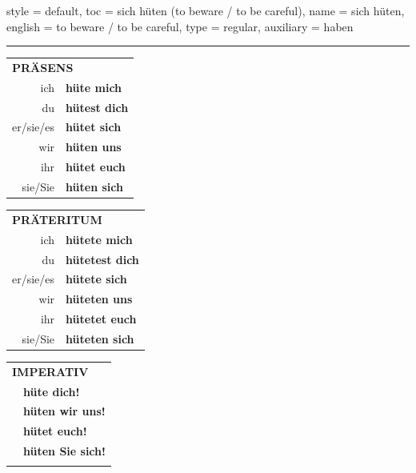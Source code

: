 \begin{verbentry}{
  style = {default},
  toc = {sich hüten (to beware / to be careful)},
  name = {sich hüten},
  english = {to beware / to be careful},
  type = {regular},
  auxiliary = {haben}
}
 
    
     \vspace{5pt}

    \hrule
    
    \vspace{5pt}

  \begin{tabular}{rl}
     \multicolumn{2}{l}{\textbf{PRÄSENS} }\\
    ich & \textbf{hüte mich}\\
    du & \textbf{hütest dich}\\
    er/sie/es & \textbf{hütet sich}\\
    wir & \textbf{hüten uns}\\
    ihr & \textbf{hütet euch}\\
    sie/Sie & \textbf{hüten sich}\\
  \end{tabular}
  \hfill
     \begin{tabular}{rl}
    \multicolumn{2}{l}{\textbf{PRÄTERITUM} }\\
    ich & \textbf{hütete mich}\\
    du & \textbf{hütetest dich}\\
    er/sie/es & \textbf{hütete sich}\\
    wir & \textbf{hüteten uns}\\
    ihr & \textbf{hütetet euch}\\
    sie/Sie & \textbf{hüteten sich}\\
  \end{tabular}
  \hfill
  \begin{tabular}{rl}
     \multicolumn{2}{l}{\textbf{IMPERATIV} }\\
   & \textbf{hüte dich!}\\
   & \textbf{hüten wir uns!}\\
   & \textbf{hütet euch!}\\
   & \textbf{hüten Sie sich!}\\
   & \vspace{10pt}
  \end{tabular}

    \vspace{10pt}


\end{verbentry}
